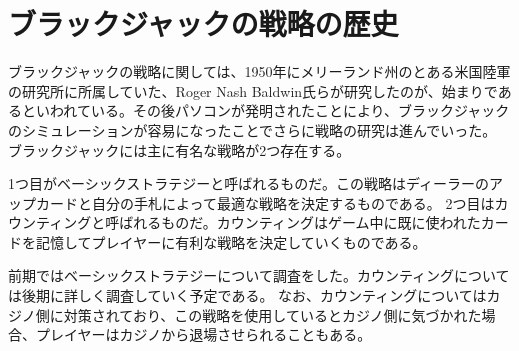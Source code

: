 
\section{ブラックジャックの戦略の歴史}
ブラックジャックの戦略に関しては、1950年にメリーランド州のとある米国陸軍の研究所に所属していた、Roger Nash Baldwin氏らが研究したのが、始まりであるといわれている。その後パソコンが発明されたことにより、ブラックジャックのシミュレーションが容易になったことでさらに戦略の研究は進んでいった。
ブラックジャックには主に有名な戦略が2つ存在する。

1つ目がベーシックストラテジーと呼ばれるものだ。この戦略はディーラーのアップカードと自分の手札によって最適な戦略を決定するものである。
2つ目はカウンティングと呼ばれるものだ。カウンティングはゲーム中に既に使われたカードを記憶してプレイヤーに有利な戦略を決定していくものである。

前期ではベーシックストラテジーについて調査をした。カウンティングについては後期に詳しく調査していく予定である。
なお、カウンティングについてはカジノ側に対策されており、この戦略を使用しているとカジノ側に気づかれた場合、プレイヤーはカジノから退場させられることもある。


